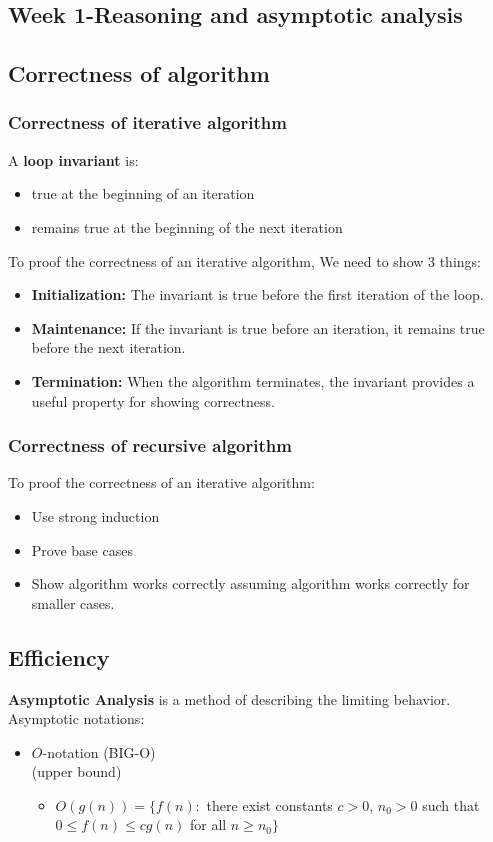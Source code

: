 \documentclass{article}
\begin{document}
\begin{multicols*}{4}

\section{Week 1-Reasoning and asymptotic analysis}
\subsection{Correctness of algorithm}

\subsubsection{Correctness of iterative algorithm}
A \textbf{loop invariant} is:
\begin{itemize}
\item true at the beginning of an iteration
\item remains true at the beginning of the next iteration
\end{itemize}

To proof the correctness of an iterative algorithm, We need to show 3 things:

\begin{itemize}
\item \textbf{Initialization:} The invariant is true before the first iteration of the loop.
\item \textbf{Maintenance:} If the invariant is true before an iteration, it remains true before the next iteration.
\item \textbf{Termination:} When the algorithm terminates, the invariant provides a useful property for showing correctness.
\end{itemize}

\subsubsection{Correctness of recursive algorithm}

To proof the correctness of an iterative algorithm:
\begin{itemize}
\item Use strong induction
\item Prove base cases
\item Show algorithm works correctly assuming algorithm works correctly for smaller cases.
\end{itemize}

\subsection{Efficiency}
\textbf{Asymptotic Analysis} is a method of describing the limiting behavior.
Asymptotic notations:
\begin{itemize}
\item $O$-notation (BIG-O)\\(upper bound)
	\begin{itemize}
	\item $O(g(n))=\{f(n):$ there exist constants $c > 0$, $n_0 > 0$ such that $0 \leq f(n) \leq cg(n)$ for all $n \geq n_0\}$
	\end{itemize}
	

\end{itemize}
\end{multicols*}
\end{document}
